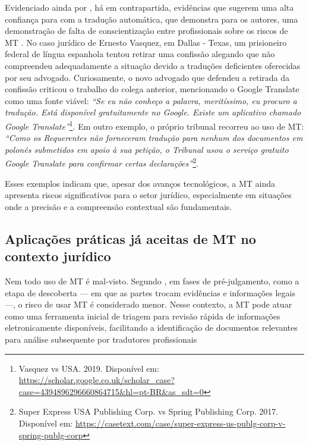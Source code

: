 Evidenciado ainda por , há em contrapartida, evidências que sugerem uma alta confiança para com a tradução automática, que demonstra para os autores, uma demonstração de falta de conscientização entre profissionais sobre os riscos de MT \cite[p. 1522]{VHS}.
No caso jurídico de Ernesto Vasquez, em Dallas - Texas, um prisioneiro federal de língua espanhola tentou retirar uma confissão alegando que não compreendeu adequadamente a situação devido a traduções deficientes oferecidas por seu advogado. Curiosamente, o novo advogado que defendeu a retirada da confissão criticou o trabalho do colega anterior, mencionando o Google Translate como uma fonte viável: \textit{“Se eu não conheço a palavra, meritíssimo, eu procuro a tradução. Está disponível gratuitamente no Google. Existe um aplicativo chamado Google Translate”}\footnote{Vasquez vs USA. 2019. Disponível em: \url{https://scholar.google.co.uk/scholar_case?case=4394896296660864715&hl=pt-BR&as_sdt=0}\label{Vasquez}}. Em outro exemplo, o próprio tribunal recorreu ao uso de MT: \textit{“Como os Requerentes não forneceram tradução para nenhum dos documentos em polonês submetidos em apoio à sua petição, o Tribunal usou o serviço gratuito Google Translate para confirmar certas declarações”}\footnote{
Super Express USA Publishing Corp. vs Spring Publishing Corp. 2017. Disponível em: \url{https://casetext.com/case/super-express-us-publg-corp-v-spring-publg-corp}\label{SuperExpress2017}}.

Esses exemplos indicam que, apesar dos avanços tecnológicos, a MT ainda apresenta riscos significativos para o setor jurídico, especialmente em situações onde a precisão e a compreensão contextual são fundamentais.

\subsection{\textbf{Aplicações práticas já aceitas de MT no contexto jurídico}}

Nem todo uso de MT é mal-visto. Segundo , em fases de pré-julgamento, como a etapa de descoberta — em que as partes trocam evidências e informações legais —, o risco de usar MT é considerado menor. Nesse contexto, a MT pode atuar como uma ferramenta inicial de triagem para revisão rápida de informações eletronicamente disponíveis, facilitando a identificação de documentos relevantes para análise subsequente por tradutores profissionais \cites[p. 45]{foster}[p. 19]{nelson}

